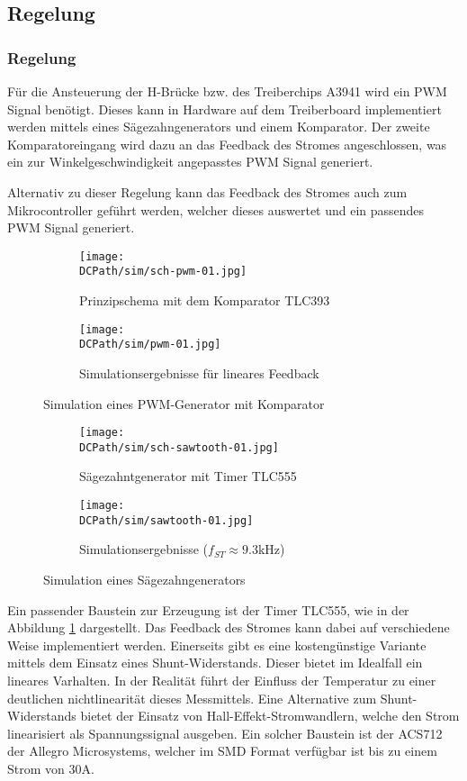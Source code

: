 \ifSTANDALONE
\subsection{Regelung}
\fi
\ifEMBED
\subsubsection{Regelung}
\fi
Für die Ansteuerung der H-Brücke bzw. des Treiberchips A3941 wird ein PWM
Signal benötigt. Dieses kann in Hardware auf dem Treiberboard implementiert
werden mittels eines Sägezahngenerators und einem Komparator. Der zweite
Komparatoreingang wird dazu an das Feedback des Stromes angeschlossen, was
ein zur Winkelgeschwindigkeit angepasstes PWM Signal generiert.

Alternativ zu dieser Regelung kann das Feedback des Stromes auch zum
Mikrocontroller geführt werden, welcher dieses auswertet und ein passendes
PWM Signal generiert.

\begin{figure}[h!]
    \centering
    \begin{subfigure}[b]{0.45\textwidth}
        \texttt{[image: \\DCPath/sim/sch-pwm-01.jpg]}
        \caption{Prinzipschema mit dem Komparator TLC393}
    \end{subfigure}
    \begin{subfigure}[b]{0.45\textwidth}
        \texttt{[image: \\DCPath/sim/pwm-01.jpg]}
        \caption{Simulationsergebnisse für lineares Feedback}
    \end{subfigure}
    \caption{Simulation eines PWM-Generator mit Komparator}
\end{figure}

\begin{figure}[h!]
    \centering
    \begin{subfigure}[b]{0.45\textwidth}
        \texttt{[image: \\DCPath/sim/sch-sawtooth-01.jpg]}
        \caption{Sägezahntgenerator mit Timer TLC555}
    \end{subfigure}
    \begin{subfigure}[b]{0.45\textwidth}
        \texttt{[image: \\DCPath/sim/sawtooth-01.jpg]}
        \caption{Simulationsergebnisse ($f_{ST} \approx 9.3$kHz)}
    \end{subfigure}
    \caption{Simulation eines Sägezahngenerators}
    \label{fig:sawtooth}
\end{figure}

Ein passender Baustein zur Erzeugung ist der Timer TLC555, wie in der
Abbildung \ref{fig:sawtooth} dargestellt. Das Feedback des Stromes kann
dabei auf verschiedene Weise implementiert werden. Einerseits gibt es eine
kostengünstige Variante mittels dem Einsatz eines Shunt-Widerstands. Dieser
bietet im Idealfall ein lineares Varhalten. In der Realität führt der
Einfluss der Temperatur zu einer deutlichen nichtlinearität dieses
Messmittels. Eine Alternative zum Shunt-Widerstands bietet der Einsatz von
Hall-Effekt-Stromwandlern, welche den Strom linearisiert als Spannungssignal
ausgeben. Ein solcher Baustein ist der ACS712 der Allegro Microsystems,
welcher im SMD Format verfügbar ist bis zu einem Strom von 30A.

